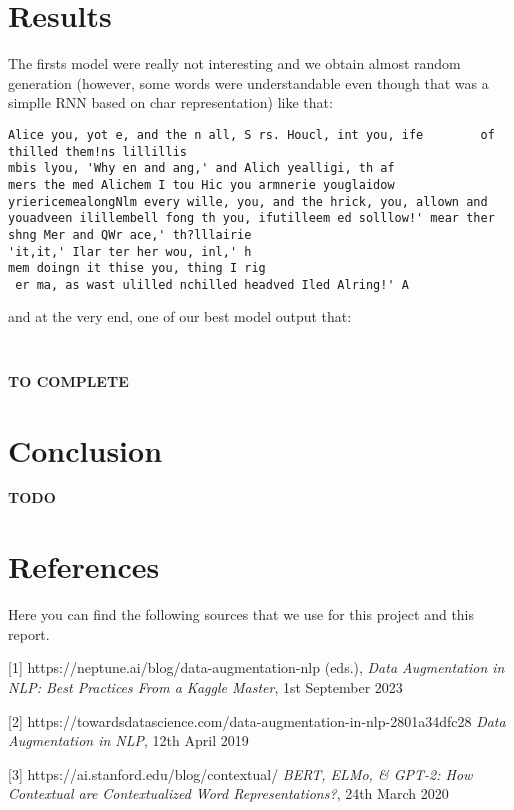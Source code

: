 \documentclass{article}
\begin{document}
\section{Results}

The firsts model were really not interesting and we obtain almost random generation (however, some words were understandable even though that was a simplle RNN based on char representation) like that:
\begin{verbatim}
Alice you, yot e, and the n all, S rs. Houcl, int you, ife        of thilled them!ns lillillis
mbis lyou, 'Why en and ang,' and Alich yealligi, th af
mers the med Alichem I tou Hic you armnerie youglaidow yriericemealongNlm every wille, you, and the hrick, you, allown and youadveen ilillembell fong th you, ifutilleem ed solllow!' mear ther shng Mer and QWr ace,' th?lllairie
'it,it,' Ilar ter her wou, inl,' h
mem doingn it thise you, thing I rig
 er ma, as wast ulilled nchilled headved Iled Alring!' A
\end{verbatim}

and at the very end, one of our best model output that:
\begin{verbatim}
    
\end{verbatim}

\textbf{TO COMPLETE}

\section{Conclusion}

\textbf{TODO}

\newpage

\section*{References}


Here you can find the following sources that we use for this project and this report.
\medskip


{
\small


[1] https://neptune.ai/blog/data-augmentation-nlp 
(eds.), {\it Data Augmentation in NLP: Best Practices From a Kaggle Master}, 1st September 2023



[2] https://towardsdatascience.com/data-augmentation-in-nlp-2801a34dfc28 {\it Data Augmentation in NLP},  12th April 2019


[3] https://ai.stanford.edu/blog/contextual/ {\it BERT, ELMo, & GPT-2: How Contextual are Contextualized Word Representations?},  24th March 2020
}
\end{document}
